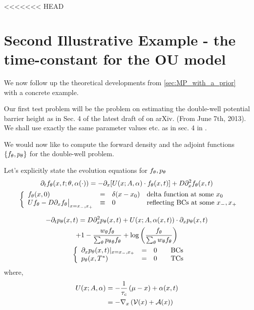 \documentclass{article}
\begin{document}
<<<<<<< HEAD
\clearpage

\section{Second Illustrative Example - the time-constant for the OU model}
\label{sec:MP_Doublewell_TimeDependent}
We now follow up the theoretical developments from \cref{sec:MP_with_a_prior}
with a concrete example.

Our first test problem will be the problem on estimating the double-well
potential barrier height as in Sec. 4 of the latest draft of \cite{Lin} on
arXiv. (From June 7th, 2013). We shall use exactly the same parameter values
etc. as in sec. 4 in \cite{Lin}.

We would now like to compute the forward density and the adjoint functions
$\{{ f_{\theta}}, { p_{\theta}}\}$ for the double-well problem.

Let's explicitly state the evolution equations for ${ f_{\theta}},{ p_{\theta}}$
\begin{equation}
\begin{gathered}
{\partial}_t { f_{\theta}}(x,t; {\theta}, {\alpha}(\cdot)) = -{\partial}_x [ U(x;A, {\alpha}) \cdot { f_{\theta}}(x,t)] + D {\partial}_x^2
{ f_{\theta}}(x,t)
\\
\begin{array}{ll}
	&
	\left\{ \begin{array}{lcll}
	 { f_{\theta}}(x,0) &=& \delta(x-x_0)  &\textrm{delta function at some } x_0
	\\
	U { f_{\theta}} - D {\partial}_x { f_{\theta}} \big|_{x={ x_{-} },{ x_{+} }} &\equiv& 0 & \textrm{reflecting BCs
	at some } { x_{-} }, { x_{+} } \end{array} \right.
\end{array}
\label{eq:forward_density_double_well}
\end{gathered}
\end{equation}

\begin{equation}
\begin{gathered}
-{\partial}_t { p_{\theta}}(x,t) =
D {\partial}_x^2 { p_{\theta}}(x,t) +
U(x;A, {\alpha}(x,t))\cdot {\partial}_x { p_{\theta}}(x,t) \\
+ 1 - \frac{  w_{\theta} { f_{\theta}} }{\sum_{\theta} { p_{\theta}}_{\theta}{ f_{\theta}}} 
+ \log\left(\frac{f_{\theta}} {\sum_{\theta} { w_{\theta} } { f_{\theta}} }\right)
\\
\begin{array}{ll}
	&
	\left\{ \begin{array}{lcll}
	{\partial}_x { p_{\theta}}(x, t)|_{x = { x_{-} }, { x_{+} }}  &=& 0  \quad &\textrm{BCs}
	\\
	{ p_{\theta}}(x,{ T^* })  &=& 0 \,& \textrm{TCs}
\end{array} \right.
\end{array}
\label{eq:backward_adjoint_double_well}
\end{gathered}
\end{equation}
where,  
\begin{eqnarray*}
U(x; A, {\alpha}) &= -\frac 1 {{ \tau_{c} }} \left( {\mu } -x \right) + {\alpha}(x,t)
\\
&= -{ \nabla }_x \left(\mathcal V(x) + \mathcal{A}(x) \right)
\end{eqnarray*}
\end{document}
